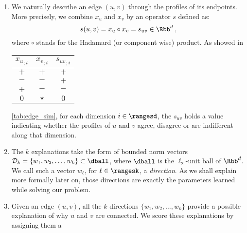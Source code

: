 \begin{enumerate}[1),nosep,leftmargin=*]
  \item We naturally describe an edge $(u,v)$ through the profiles of its endpoints. More precisely,
    we combine $x_u$ and $x_v$ by an operator $s$ defined as:
    \begin{equation*}
      s(u, v) = x_u \circ x_v = s_{uv} \in \Rbb^d \, ,
    \end{equation*}
    where $\circ$ stands for the Hadamard (or component wise) product. As showed in
    \begin{marginfigure}
      \captionsetup{font=small,type=table}
      \begin{tabular}{ccc}
        \toprule
        ${x_u}_{;i}$ & ${x_v}_{;i}$ & ${s_{uv}}_{;i}$ \\
        \midrule
        $+$          & $+$          & $+$             \\
        $-$          & $-$          & $+$             \\
        $+$          & $-$          & $-$             \\
        $0$          & $\star$      & $0$             \\
        \bottomrule
      \end{tabular}
    \end{marginfigure}
    \autoref{tab:edge_sim}, for each dimension $i \in \rangesd$, the $s_{uv}$ holds a value
    indicating whether the profiles of $u$ and $v$ agree, disagree or are indifferent along that
    dimension.
  \item The $k$ explanations take the form of bounded norm vectors $\mathcal{D}_k = \{w_1, w_2,
    \ldots, w_k\} \subset \dball$, where $\dball$ is the $\ell_2$-unit ball of $\Rbb^d$. We call such a
    vector $w_\ell$, for $\ell \in \rangesk$, a \emph{direction}. As we shall explain more formally
    later on, those directions are exactly the parameters learned while solving our problem.
  \item Given an edge $(u,v)$, all the $k$ directions $\{w_1, w_2, \ldots, w_k\}$ provide a possible
    explanation of why $u$ and $v$ are connected. We score these explanations by assigning them a

\end{enumerate}
